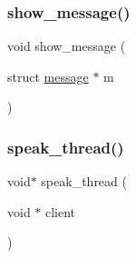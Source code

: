 \subsubsection{\texorpdfstring{show\+\_\+message()}{show\_message()}}
{\footnotesize\ttfamily void show\+\_\+message (\begin{DoxyParamCaption}\item[{struct \hyperlink{structmessage}{message} $\ast$}]{m }\end{DoxyParamCaption})}

\mbox{\label{zip-zop-client_8c_a7ca038c133aa6aca1c539e69d4ee675f}} 
\subsubsection{\texorpdfstring{speak\+\_\+thread()}{speak\_thread()}}
{\footnotesize\ttfamily void$\ast$ speak\+\_\+thread (\begin{DoxyParamCaption}\item[{void $\ast$}]{client }\end{DoxyParamCaption})}

